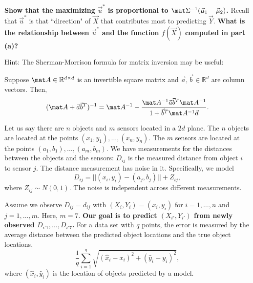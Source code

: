 \documentclass[preview]{standalone}
\begin{document}
\begin{Parts}
{\bf Show that the maximizing $\vec u^*$ is proportional to $\mat \Sigma^{-1} (\vec \mu_1 - \vec \mu_2)$.} Recall that $\vec u^*$ is that ``direction" of $\vec X$ that contributes most to predicting $\vec Y$. {\bf What is the relationship between $\vec u^*$ and the function $f(\vec X)$ computed in part (a)?}

Hint: The Sherman-Morrison formula for matrix inversion may be useful:

Suppose $\mat A\in \mathbb {R} ^{d\times d}$ is an invertible square matrix and $\vec a, \vec b\in \mathbb {R}^{d}$ are column vectors. Then,
\begin{align*}
(\mat A+\vec a\vec b^{T})^{-1}=\mat A^{-1}- \frac{\mat A^{-1}\vec a\vec b^{T}\mat A^{-1}}{1+\vec b^{T}\mat A^{-1}\vec a}.
\end{align*}


\iffalse
\Part {\bf Repeat the above part for arbitrary probabilities $\pi_1, \pi_2$.}


\fi


\iffalse
\Part Now assume you don't know the parameters $\mu_1, \mu_2, \Sigma$, but are given samples of training data $(x_1, \ell_1), (x_2, \ell_2), \ldots, (x_n, \ell_n)$ drawn from the above distribution. You are then given a new $X_{\text{test}}$, which you wish to classify. Using your intuition from CCA, {\bf write down a procedure that predicts the label of $X_{\text{test}}$.}


\fi

\end{Parts}


Let us say there are $n$ objects and $m$ sensors located in a $2d$ plane. The
$n$ objects are located at the points $(x_1,y_1),\ldots,(x_n,y_n)$. The $m$
sensors are located at the points $(a_1,b_1),\ldots,(a_m,b_m)$.  We have
measurements for the distances between the objects and the sensors: $D_{ij}$ is
the measured distance from object $i$ to sensor $j$. The distance measurement
has noise in it. Specifically, we model $$D_{ij} = ||(x_i,
y_i)-(a_j,b_j)||+Z_{ij},$$ where $Z_{ij} \sim N(0, 1)$. The noise is
independent across different measurements.

Assume we observe $D_{ij}=d_{ij}$ with $(X_i,Y_i)=(x_i,y_i)$ for $i=1,\dots, n$
and $j=1,\dots,m$. Here, $m=7$. \textbf{Our goal is to predict
$(X_{i'},Y_{i'})$ from newly observed $D_{{i'}1},\dots,D_{{i'}7}$.} For a data
set with $q$ points, the error is measured by the average distance between
the predicted object locations and the true object locations,
$$\frac{1}{q}\sum_{i=1}^q\sqrt{(\hat x_i-x_i)^2 + (\hat y_i - y_i)^2},$$ where
$(\hat x_i, \hat y_i)$ is the location of objects predicted by a model.
\end{document}
